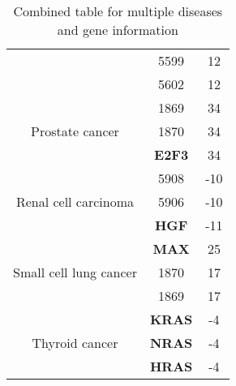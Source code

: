 \begin{table}[h!]
\begin{tabular}{|c|c|c|}
    \cline{2-3} & 5599 & 12 \\
    
    \cline{2-3} & 5602 & 12 \\
    \hline\multirow{3}{*}{Prostate cancer} & 1869 & 34 \\ 

    \cline{2-3} & 1870 & 34 \\
    
    \cline{2-3} & \textbf{E2F3} & 34 \\
    \hline\multirow{3}{*}{Renal cell carcinoma} & 5908 & -10 \\ 

    \cline{2-3} & 5906 & -10 \\
    
    \cline{2-3} & \textbf{HGF} & -11 \\
    \hline\multirow{3}{*}{Small cell lung cancer} & \textbf{MAX} & 25 \\ 

    \cline{2-3} & 1870 & 17 \\
    
    \cline{2-3} & 1869 & 17 \\
    \hline\multirow{3}{*}{Thyroid cancer} & \textbf{KRAS} & -4 \\ 

    \cline{2-3} & \textbf{NRAS} & -4 \\
    
    \cline{2-3} & \textbf{HRAS} & -4 \\
    \hline
    \end{tabular}
    \caption{Combined table for multiple diseases and gene information}
    \label{tab:combined}
\end{table}
        